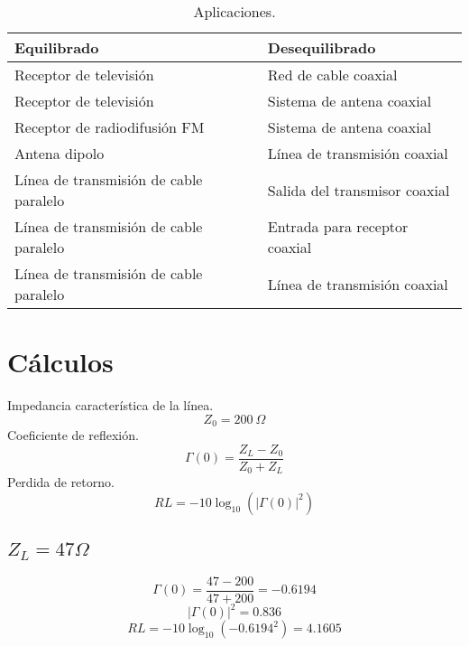 \documentclass[12pt,letterpaper]{article}
\begin{document}
\begin{table}[ht]
    \centering
    \begin{tabular}{|l|l|}
    \hline
    \textbf{Equilibrado} & \textbf{Desequilibrado} \\ \hline
    Receptor de televisión & Red de cable coaxial \\ \hline
    Receptor de televisión & Sistema de antena coaxial \\ \hline
    Receptor de radiodifusión FM & Sistema de antena coaxial \\ \hline
    Antena dipolo & Línea de transmisión coaxial \\ \hline
    Línea de transmisión de cable paralelo & Salida del transmisor coaxial \\ \hline
    Línea de transmisión de cable paralelo & Entrada para receptor coaxial \\ \hline
    Línea de transmisión de cable paralelo & Línea de transmisión coaxial \\ \hline
    \end{tabular}
    \caption{Aplicaciones.}
\end{table}

\section{Cálculos}
Impedancia característica de la línea.
\begin{equation}
    Z_0=200 \ \Omega
\end{equation}
Coeficiente de reflexión.
\begin{equation}
    \Gamma(0)=\frac{Z_L-Z_0}{Z_0+Z_L}
\end{equation}
Perdida de retorno.
\begin{equation}
    RL=-10\log_{10} (|\Gamma(0)|^{2})
\end{equation}

\subsection{$Z_L=47 \Omega$}
\begin{equation}
    \Gamma(0)=\frac{47-200}{47+200}=-0.6194
\end{equation}
\begin{equation}
    |\Gamma(0)|^{2}=0.836
\end{equation}
\begin{equation}
    RL=-10\log_{10} (-0.6194^{2})=4.1605
\end{equation}
\end{document}
